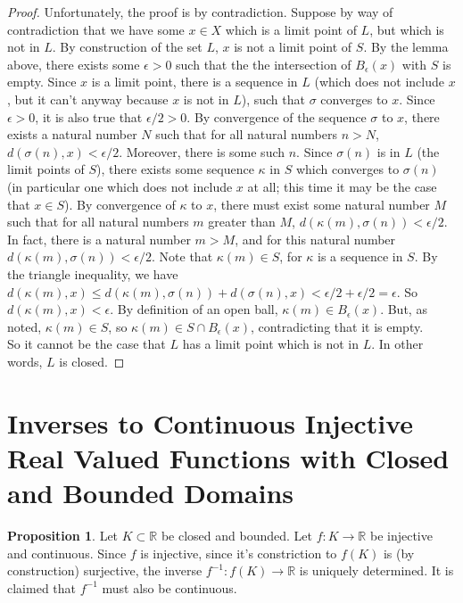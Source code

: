 \documentclass[11pt]{article}
\newcommand{\R}{\mathbb{R}}
\newcommand{\inv}[1]{{#1}^{-1}}
\theoremstyle{definition}
\newtheorem{proposition}{Proposition}
\begin{document}
\begin{proof} Unfortunately, the proof is by contradiction. Suppose by way of contradiction that we have some $x\in X$ which is a limit point of $L$, but which is not in $L$. By construction of the set $L$, $x$ is not a limit point of $S$. By the lemma above, there exists some $\epsilon > 0$ such that the the intersection of $B_\epsilon(x)$ with $S$ is empty. Since $x$ is a limit point, there is a sequence in $L$ (which does not include $x$, but it can't anyway because $x$ is not in $L$), such that $\sigma$ converges to $x$. Since $\epsilon > 0$, it is also true that $\epsilon/2 > 0$. By convergence of the sequence $\sigma$ to $x$, there exists a natural number $N$ such that for all natural numbers $n > N$, $d(\sigma(n), x) < \epsilon /2$. Moreover, there is some such $n$. Since $\sigma(n)$ is in $L$ (the limit points of $S$), there exists some sequence $\kappa$ in $S$ which converges to $\sigma(n)$ (in particular one which does not include $x$ at all; this time it may be the case that $x\in S$). By convergence of $\kappa$ to $x$, there must exist some natural number $M$ such that for all natural numbers $m$ greater than $M$, $ d(\kappa(m), \sigma(n) ) < \epsilon /2 $. In fact, there is a natural number $m > M$, and for this natural number $d(\kappa(m), \sigma(n)) < \epsilon/2$. Note that $\kappa(m)\in S$, for $\kappa$ is a sequence in $S$. By the triangle inequality, we have $d(\kappa(m), x) \le d(\kappa(m), \sigma(n)) + d(\sigma(n), x) < \epsilon/2 + \epsilon/2 = \epsilon$. So $ d(\kappa(m), x) < \epsilon $. By definition of an open ball, $ \kappa(m) \in B_\epsilon(x) $. But, as noted, $\kappa(m)\in S$, so $\kappa(m)\in S\cap B_\epsilon(x)$, contradicting that it is empty.\\

So it cannot be the case that $L$ has a limit point which is not in $L$. In other words, $L$ is closed.
\end{proof}

\section{Inverses to Continuous Injective Real Valued Functions with Closed and Bounded Domains}

\begin{proposition}

Let $K\subset \R$ be closed and bounded. Let $f:K\to \R$ be injective and continuous. Since $f$ is injective, since it's constriction to $f(K)$ is (by construction) surjective, the inverse $\inv{f}: f(K)\to \R$ is uniquely determined. It is claimed that $\inv{f}$ must also be continuous. 

\end{proposition}
\end{document}
